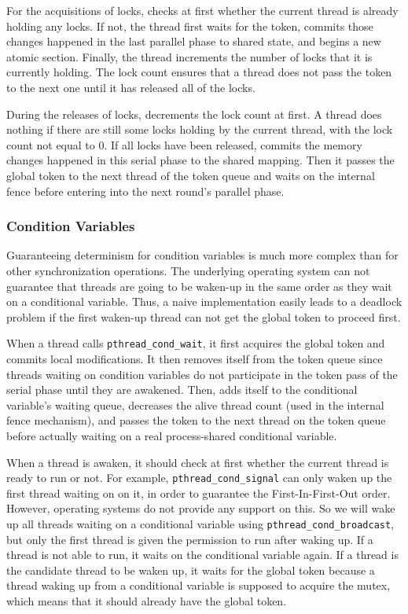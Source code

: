 For the acquisitions of locks, \dthreads{} checks at first 
whether the current thread is already holding any locks. If not, the thread first waits for the token, commits those changes happened in the last parallel phase to shared state, and begins a new atomic section. Finally, the thread increments the number of locks that it is currently holding. The lock count ensures that a thread does not pass the token to the next one until it has released all of the locks.

During the releases of locks, \dthreads{} decrements the lock count at first. A thread does nothing if there are still some locks holding by the current thread, with the lock count not equal to 0. If all locks have been released, \dthreads{} commits the memory changes happened in this serial phase to the shared mapping. Then it passes the global token to the next thread of the token queue and waits on the internal fence before entering into the next round's parallel phase.

\subsubsection{Condition Variables}
\label{sec:condwait}

Guaranteeing determinism for condition variables is much more complex than for other synchronization operations. The underlying operating system can not guarantee that threads are going to be waken-up in the same order as they wait on a conditional variable. Thus, a naive implementation easily leads to a deadlock problem if the first waken-up thread can not get the global token to proceed first.

When a thread calls \texttt{pthread\_cond\_wait}, it first acquires the global token and commits local modifications. It then removes itself from the token queue since threads waiting on condition variables do not participate in the token pass of the serial phase until they are awakened. Then, \dthreads{} adds itself to the conditional variable's waiting queue, decreases the alive thread count (used in the internal fence mechanism), and passes the token to the next thread on the token queue before actually waiting on a real process-shared conditional variable. 

When a thread is awaken, it should check at first whether the current thread is ready to run or not. For example, \texttt{pthread\_cond\_signal} can only waken up the first thread waiting on on it, in order to guarantee the First-In-First-Out order. However, operating systems do not provide any support on this. So we will wake up all threads waiting on a conditional variable using \texttt{pthread\_cond\_broadcast}, but only the first thread is given the permission to run after waking up. If a thread is not able to run, it waits on the conditional variable again. If a thread is the candidate thread to be waken up, it waits for the global token because a thread waking up from a conditional variable is supposed to acquire the mutex, which means that it should already have the global token. 

